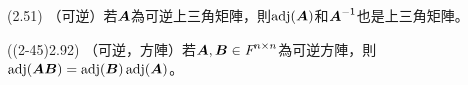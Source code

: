 \item \begin{theorem}{(2.51)} （可逆）若$\mat{A}$為可逆上三角矩陣，則$\adj{A}$和$\mat{A}\inv$也是上三角矩陣。
\end{theorem}

\item \begin{theorem}{((2-45)2.92)} （可逆，方陣）若$\mat{A}, \mat{B} \in \F^{n \times n}$為可逆方陣，則$\adj{\mat{AB}} = \adj{\mat{B}}\adj{\mat{A}}$。
\end{theorem}